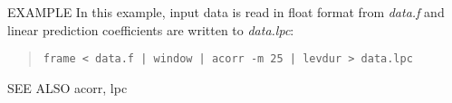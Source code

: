\begin{options}
\end{options}

\begin{qsection}{EXAMPLE}
In this example, input data is read in float format from
{\em data.f} and linear prediction coefficients are written
to {\em data.lpc}:
\begin{quote}
 \verb!frame < data.f | window | acorr -m 25 | levdur > data.lpc!
\end{quote} 
\end{qsection}

\begin{qsection}{SEE ALSO}
 acorr, lpc
\end{qsection}
